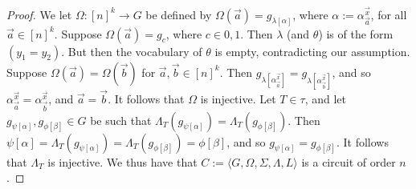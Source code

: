 \documentclass[../paper.tex]{subfiles}
\begin{document}
\begin{proof}
  We let $\Omega : [n]^k \rightarrow G$ be defined by $\Omega (\vec{a}) =
  g_{\lambda [\alpha]}$, where $\alpha := \alpha^{\vec{x}}_{\vec{a}}$, for all
  $\vec{a} \in [n]^k$. Suppose $\Omega (\vec{a}) = g_c$, where $ c \in {0,1}$.
  Then $\lambda$ (and $\theta$) is of the form $(y_1 = y_2)$. But then the
  vocabulary of $\theta$ is empty, contradicting our assumption. Suppose $\Omega
  (\vec{a}) = \Omega(\vec{b})$ for $\vec{a}, \vec{b} \in [n]^k$. Then
  $g_{\lambda[\alpha^{\vec{x}}_{\vec{a}}]} =
  g_{\lambda[\alpha^{\vec{x}}_{\vec{b}}]}$, and so $\alpha^{\vec{x}}_{\vec{a}} =
  \alpha^{\vec{x}}_{\vec{b}}$, and $\vec{a} = \vec{b}$. It follows that $\Omega$
  is injective. Let $T \in \tau$, and let $g_{\psi[\alpha]}, g_{\phi[\beta]} \in
  G$ be such that $\Lambda_T (g_{\psi[\alpha]}) = \Lambda_T (g_{\phi[\beta]})$.
  Then $\psi[\alpha] = \Lambda_T (g_{\psi[\alpha]}) = \Lambda_T
  (g_{\phi[\beta]}) = \phi[\beta]$, and so $g_{\psi[\alpha]} = g_{\phi[\beta]}$.
  It follows that $\Lambda_T$ is injective. We thus have that $C := \langle G,
  \Omega, \Sigma, \Lambda, L \rangle$ is a circuit of order $n$.


\end{proof}
\end{document}
